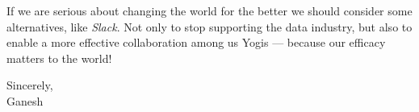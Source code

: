 \documentclass[12pt]{article}
\begin{document}
If we are serious about changing the world for the better we should consider some alternatives, like \textit{Slack}.
Not only to stop supporting the data industry, but also to enable a more effective collaboration among us Yogis --- because our efficacy matters to the world!

\bigskip

Sincerely,\\
Ganesh
\end{document}
